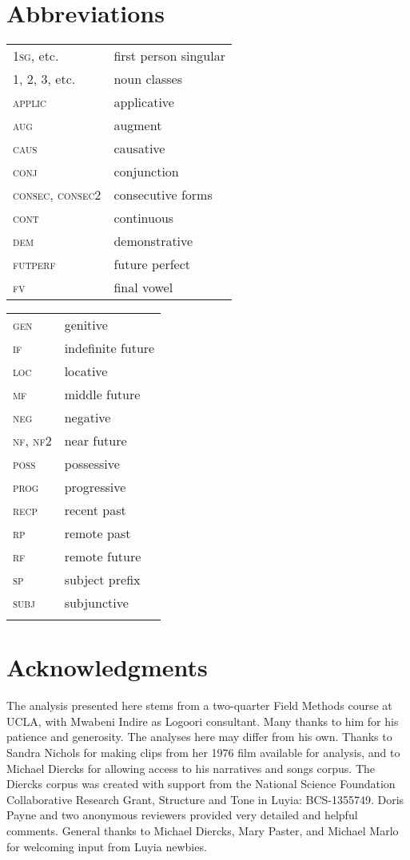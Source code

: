 \documentclass[output=paper]{langsci/langscibook}
\begin{document}
\section*{Abbreviations}
\begin{tabularx}{.45\textwidth}{lX}
\textsc{1sg}, etc. &  first person singular \\
1, 2, 3, etc. & noun classes \\
\textsc{applic} & applicative \\
\textsc{aug}  &  augment\\
\textsc{caus} &   causative \\
\textsc{conj}   &  conjunction \\
\textsc{consec, consec2} &  consecutive forms \\
\textsc{cont}  &  continuous \\
\textsc{dem}  &  demonstrative \\
\textsc{futperf} & future    perfect \\
\textsc{fv}  &  final vowel \\
\end{tabularx}
\begin{tabularx}{.45\textwidth}{lX}
\textsc{gen}  &  genitive \\
\textsc{if}  &  indefinite future \\
\textsc{loc}  &  locative \\
\textsc{mf} &   middle future \\
\textsc{neg}  &  negative \\
\textsc{nf, nf2} & near future \\
\textsc{poss}  &  possessive \\
\textsc{prog}  &  progressive \\
\textsc{recp}  &  recent past \\
\textsc{rp}  &  remote past \\
\textsc{rf}  &  remote future \\
\textsc{sp}  &  subject prefix \\
\textsc{subj}   & subjunctive \\
 \\
\end{tabularx} 

\section*{Acknowledgments}

The analysis presented here stems from a two-quarter Field Methods course at UCLA, with Mwabeni Indire as Logoori consultant. Many thanks to him for his patience and generosity. The analyses here may differ from his own. Thanks to Sandra Nichols for making clips from her 1976 film available for analysis, and to Michael Diercks for allowing access to his narratives and songs corpus. The Diercks corpus was created with support from the National Science Foundation Collaborative Research Grant, Structure and Tone in Luyia: BCS-1355749. Doris Payne and two anonymous reviewers provided very detailed and helpful comments. General thanks to Michael Diercks, Mary Paster, and Michael Marlo for welcoming input from Luyia newbies.

\printbibliography[heading=subbibliography,notkeyword=this]
\end{document}
